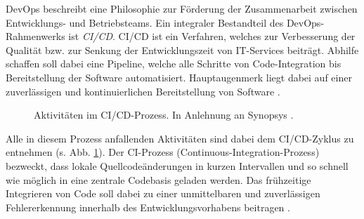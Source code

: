 DevOps beschreibt eine Philosophie zur Förderung der Zusammenarbeit zwischen Entwicklungs- und Betriebsteams. Ein integraler Bestandteil des DevOps-Rahmen\-werks ist \textit{\ac{CI/CD}}. CI/CD ist ein Verfahren, welches zur Verbesserung der Qualität bzw. zur Senkung der Entwicklungszeit von IT-Services beiträgt. Abhilfe schaffen soll dabei eine Pipeline, welche alle Schritte von Code-Integration bis Bereitstellung der Software automatisiert. Hauptaugenmerk liegt dabei auf einer zuverlässigen und kontinuierlichen Bereitstellung von Software \cite[471]{Zampetti.92720211012021}.
\begin{center}
	\begin{figure}[H]
		\centering
		\captionsetup{format=myformat}
		\caption[Aktivitäten im CI/CD-Prozess]{Aktivitäten im CI/CD-Prozess. In Anlehnung an Synopsys \cite{.20230201}.}
		\label{fig:CICD_Cycle}
	\end{figure}
\end{center}
\vspace*{-15mm}
Alle in diesem Prozess anfallenden Aktivitäten sind dabei dem CI/CD-Zyklus zu entnehmen (s. Abb. \ref*{fig:CICD_Cycle}). Der \acs{CI}-Prozess (Continuous-Integration-Prozess) bezweckt, dass lokale Quellcode\-änderungen in kurzen Intervallen und so schnell wie möglich in eine zentrale Codebasis geladen werden. Das frühzeitige Integrieren von Code soll dabei zu einer unmittelbaren und zuverlässigen Fehlererkennung innerhalb des Entwicklungsvorhabens beitragen \cite[471]{Zampetti.92720211012021}. 
